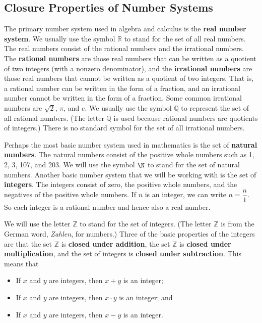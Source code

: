 \subsection*{Closure Properties of Number Systems}\label{ss:closure} 
%
The primary number system used in algebra and calculus is the \textbf{real number system}.
%
  We usually use the symbol $\mathbb{R}$ 
\label{sym:reals}%
 to stand for the set of all real numbers.  The real numbers consist of the rational numbers
%
 and the irrational numbers.
%
  The \textbf{rational numbers} are those real numbers that can be written as a quotient of two integers (with a nonzero denominator), and the \textbf{irrational numbers} are those real numbers that cannot be written as a quotient of two integers.   That is, a rational number can be written in the form of a fraction, and an irrational number cannot be written in the form of a fraction.  Some common irrational numbers are $\sqrt{2}$, $\pi$, and $e$.  We usually use the symbol $\mathbb{Q}$  to represent the set of all rational numbers.  (The letter $\mathbb{Q}$ 
\label{sym:rationals}%
is used because rational numbers are quotients of integers.)  There is no standard symbol for the set of all irrational numbers.

Perhaps the most basic number system used in mathematics is the set of 
\textbf{natural numbers}.
%
The natural numbers consist of the positive whole numbers such as 1, 2, 3, 107, and 203.  We will use the symbol $\N$ 
\label{sym:natural}%
to stand for the set of natural numbers.  Another basic number system that we will be working with is the set of 
\textbf{integers}.
%
  The integers consist of zero, the positive whole numbers, and the negatives of the positive whole numbers.  If  $n$  is an integer, we can write  $n = \dfrac{n}{1}$.  So each integer is a rational number and hence also a real number.

We will use the letter  $\mathbb{Z}$ 
\label{sym:integers}%
 to stand for the set of integers.  (The letter  $\mathbb{Z}$ is from the German word, \emph{Zahlen}, for numbers.)  Three of the basic properties of the integers are that  the set  $\mathbb{Z}$ is \textbf{closed under addition}, 
%
the set  $\mathbb{Z}$ is \textbf{closed under multiplication}, 
%
and the set of integers is \textbf{closed under subtraction}.  
%
This means that
\begin{itemize}
  \item If  $x$  and  $y$  are integers, then  $x + y$ is an integer;

  \item If  $x$  and  $y$  are integers, then  $x \cdot y$ is an integer; and

  \item If  $x$  and  $y$  are integers, then  $x - y$ is an integer.

\end{itemize}

